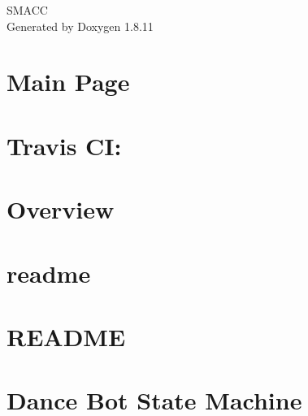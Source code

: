 \documentclass[twoside]{book}
\newcommand{\+}{\discretionary{\mbox{\scriptsize$\hookleftarrow$}}{}{}}
\newcommand{\clearemptydoublepage}{%
  \newpage{\pagestyle{empty}\cleardoublepage}%
}
\begin{document}
\hypersetup{pageanchor=false,
             bookmarksnumbered=true,
             pdfencoding=unicode
            }
\begin{titlepage}
\vspace*{7cm}
\begin{center}%
{\Large S\+M\+A\+CC }\\
\vspace*{1cm}
{\large Generated by Doxygen 1.8.11}\\
\end{center}
\end{titlepage}
\clearemptydoublepage
\tableofcontents
\clearemptydoublepage
{}
\hypersetup{pageanchor=true}

\chapter{Main Page}
\label{index}\hypertarget{index}{}
\chapter{Travis CI\+:}
\label{md_README}
\hypertarget{md_README}{}

\chapter{Overview}
\label{md_rosdoc_lite_README}
\hypertarget{md_rosdoc_lite_README}{}

\chapter{readme}
\label{md_smacc_diagnostics_readme}
\hypertarget{md_smacc_diagnostics_readme}{}

\chapter{R\+E\+A\+D\+ME}
\label{md_smacc_sm_reference_library_sm_atomic_README}
\hypertarget{md_smacc_sm_reference_library_sm_atomic_README}{}

\chapter{Dance Bot State Machine}
\label{md_smacc_sm_reference_library_sm_dance_bot_launch_readme}
\hypertarget{md_smacc_sm_reference_library_sm_dance_bot_launch_readme}{}

\end{document}

